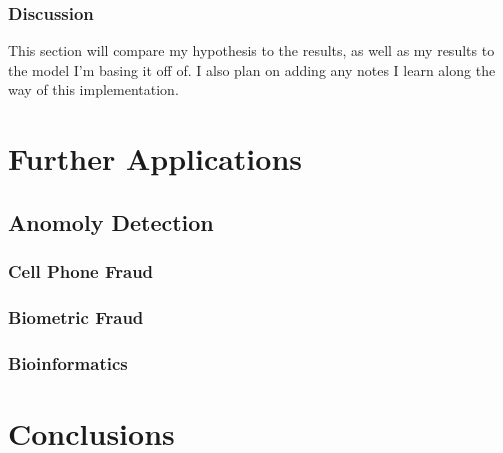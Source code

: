 \documentclass[midd]{thesis}
\begin{document}
\subsection{Discussion}

This section will compare my hypothesis to the results, as well as my results to the model I'm basing it off of. I also plan on adding any notes I learn along the way of this implementation.
\pagebreak
\chapter{Further Applications}


\section{Anomoly Detection}

\subsection{Cell Phone Fraud}

\subsection{Biometric Fraud}

\subsection{Bioinformatics}

\pagebreak
\chapter{Conclusions}




\end{document}
